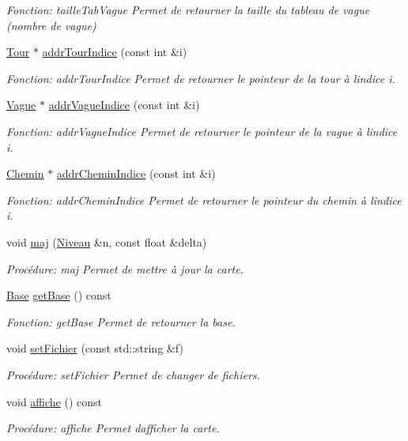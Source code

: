 \begin{DoxyCompactItemize}
\begin{DoxyCompactList}\small\item\em Fonction\+: taille\+Tab\+Vague Permet de retourner la taille du tableau de vague (nombre de vague) \end{DoxyCompactList}\item 
\hyperlink{classTour}{Tour} $\ast$ \hyperlink{classCarte_a573a9aa2b9917152357b710fe0be6ecc}{addr\+Tour\+Indice} (const int \&i)
\begin{DoxyCompactList}\small\item\em Fonction\+: addr\+Tour\+Indice Permet de retourner le pointeur de la tour à l\textquotesingle{}indice i. \end{DoxyCompactList}\item 
\hyperlink{classVague}{Vague} $\ast$ \hyperlink{classCarte_a21708cf932e4d0e74ed0222f7950582a}{addr\+Vague\+Indice} (const int \&i)
\begin{DoxyCompactList}\small\item\em Fonction\+: addr\+Vague\+Indice Permet de retourner le pointeur de la vague à l\textquotesingle{}indice i. \end{DoxyCompactList}\item 
\hyperlink{classChemin}{Chemin} $\ast$ \hyperlink{classCarte_a16a507cb5eb10f57f0d34052db75689c}{addr\+Chemin\+Indice} (const int \&i)
\begin{DoxyCompactList}\small\item\em Fonction\+: addr\+Chemin\+Indice Permet de retourner le pointeur du chemin à l\textquotesingle{}indice i. \end{DoxyCompactList}\item 
void \hyperlink{classCarte_acab09788089999f806da300dd9b162ff}{maj} (\hyperlink{classNiveau}{Niveau} \&n, const float \&delta)
\begin{DoxyCompactList}\small\item\em Procédure\+: maj Permet de mettre à jour la carte. \end{DoxyCompactList}\item 
\hyperlink{classBase}{Base} \hyperlink{classCarte_ae849d9931469bda9845a90791a2067de}{get\+Base} () const
\begin{DoxyCompactList}\small\item\em Fonction\+: get\+Base Permet de retourner la base. \end{DoxyCompactList}\item 
void \hyperlink{classCarte_a66c41e01a4a8730630bd77b6dd1b670e}{set\+Fichier} (const std\+::string \&f)
\begin{DoxyCompactList}\small\item\em Procédure\+: set\+Fichier Permet de changer de fichiers. \end{DoxyCompactList}\item 
void \hyperlink{classCarte_ac665513f49b01111c18e7f482eb346d2}{affiche} () const
\begin{DoxyCompactList}\small\item\em Procédure\+: affiche Permet d\textquotesingle{}afficher la carte. \end{DoxyCompactList}\end{DoxyCompactItemize}


